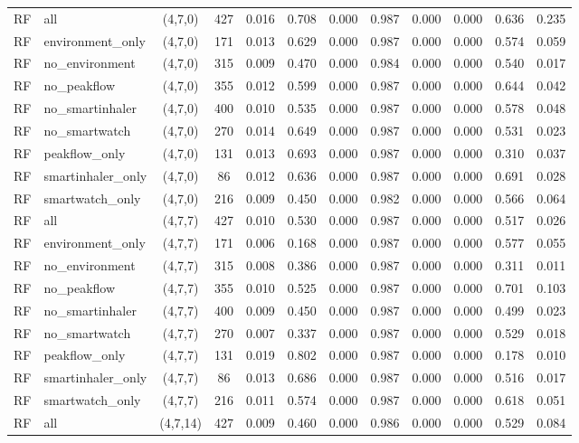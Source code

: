 \begin{longtable}{llcccccccccc}
RF & all & (4,7,0) & 427 & 0.016 & 0.708 & 0.000 & 0.987 & 0.000 & 0.000 & 0.636 & 0.235 \\
RF & environment\_only & (4,7,0) & 171 & 0.013 & 0.629 & 0.000 & 0.987 & 0.000 & 0.000 & 0.574 & 0.059 \\
RF & no\_environment & (4,7,0) & 315 & 0.009 & 0.470 & 0.000 & 0.984 & 0.000 & 0.000 & 0.540 & 0.017 \\
RF & no\_peakflow & (4,7,0) & 355 & 0.012 & 0.599 & 0.000 & 0.987 & 0.000 & 0.000 & 0.644 & 0.042 \\
RF & no\_smartinhaler & (4,7,0) & 400 & 0.010 & 0.535 & 0.000 & 0.987 & 0.000 & 0.000 & 0.578 & 0.048 \\
RF & no\_smartwatch & (4,7,0) & 270 & 0.014 & 0.649 & 0.000 & 0.987 & 0.000 & 0.000 & 0.531 & 0.023 \\
RF & peakflow\_only & (4,7,0) & 131 & 0.013 & 0.693 & 0.000 & 0.987 & 0.000 & 0.000 & 0.310 & 0.037 \\
RF & smartinhaler\_only & (4,7,0) & 86 & 0.012 & 0.636 & 0.000 & 0.987 & 0.000 & 0.000 & 0.691 & 0.028 \\
RF & smartwatch\_only & (4,7,0) & 216 & 0.009 & 0.450 & 0.000 & 0.982 & 0.000 & 0.000 & 0.566 & 0.064 \\
RF & all & (4,7,7) & 427 & 0.010 & 0.530 & 0.000 & 0.987 & 0.000 & 0.000 & 0.517 & 0.026 \\
RF & environment\_only & (4,7,7) & 171 & 0.006 & 0.168 & 0.000 & 0.987 & 0.000 & 0.000 & 0.577 & 0.055 \\
RF & no\_environment & (4,7,7) & 315 & 0.008 & 0.386 & 0.000 & 0.987 & 0.000 & 0.000 & 0.311 & 0.011 \\
RF & no\_peakflow & (4,7,7) & 355 & 0.010 & 0.525 & 0.000 & 0.987 & 0.000 & 0.000 & 0.701 & 0.103 \\
RF & no\_smartinhaler & (4,7,7) & 400 & 0.009 & 0.450 & 0.000 & 0.987 & 0.000 & 0.000 & 0.499 & 0.023 \\
RF & no\_smartwatch & (4,7,7) & 270 & 0.007 & 0.337 & 0.000 & 0.987 & 0.000 & 0.000 & 0.529 & 0.018 \\
RF & peakflow\_only & (4,7,7) & 131 & 0.019 & 0.802 & 0.000 & 0.987 & 0.000 & 0.000 & 0.178 & 0.010 \\
RF & smartinhaler\_only & (4,7,7) & 86 & 0.013 & 0.686 & 0.000 & 0.987 & 0.000 & 0.000 & 0.516 & 0.017 \\
RF & smartwatch\_only & (4,7,7) & 216 & 0.011 & 0.574 & 0.000 & 0.987 & 0.000 & 0.000 & 0.618 & 0.051 \\
RF & all & (4,7,14) & 427 & 0.009 & 0.460 & 0.000 & 0.986 & 0.000 & 0.000 & 0.529 & 0.084 \\

\end{longtable}
